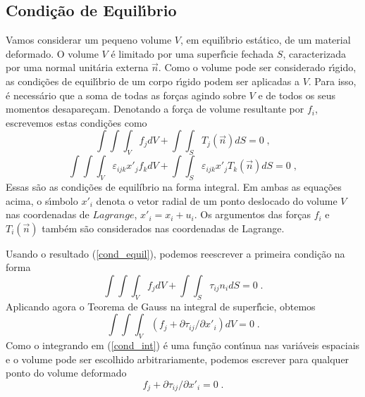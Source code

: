\subsection{Condi\c{c}\~ao de Equil\'{\i}brio}

Vamos considerar um pequeno volume $V$, em
equil\'{\i}brio est\'atico, de um material deformado.
O volume $V$ \'e limitado por uma
superf\'{\i}cie fechada $S$, caracterizada por uma normal unit\'aria
externa $\vec{n}$. Como o volume pode ser considerado r\'{\i}gido,
as condi\c{c}\~oes de equil\'{\i}brio de um corpo r\'{\i}gido
podem ser aplicadas a $V$. Para isso, \'e necess\'ario que a soma
de todas as for\c{c}as agindo sobre $V$ e de todos os seus momentos
desapare\c{c}am. Denotando a for\c{c}a de volume resultante por
$f_i$, escrevemos estas condi\c{c}\~oes como
\begin{equation}
\label{eq:equilib-for}
 \int \!\! \int \!\!  \int_V f_j dV + \int \!\! \int_S T_j
(\vec{n}) dS = 0 \;,
\end{equation}
\begin{equation}
\label{eq:equilib-momen}
 \int \!\! \int \!\!  \int_V \varepsilon_{ijk} x'_j f_k dV + \int \!\! \int_S
\varepsilon_{ijk} x'_j T_k (\vec{n}) dS = 0 \;,
\end{equation}
Essas s\~ao as condi\c{c}\~oes de equil\'ibrio na forma integral.
Em ambas as equa\c{c}\~oes acima, o
s\'{\i}mbolo $x'_i$ denota o vetor radial de um ponto deslocado do
volume $V$ nas coordenadas de $Lagrange$, $x'_i = x_i+u_i$. Os
argumentos das for\c{c}as $f_i$ e $T_i (\vec{n})$ tamb\'em s\~ao
considerados nas coordenadas de Lagrange.

Usando o resultado (\ref{cond_equil}), podemos reescrever a
primeira condi\c{c}\~ao na forma
\begin{equation} \int \!\! \int
\!\! \int_V f_j dV + \int \!\! \int_S \tau_{ij}n_i dS = 0 \;.
\end{equation}
Aplicando agora o Teorema de Gauss na integral de superf\'{\i}cie,
obtemos
\begin{equation}
\int \!\! \int \!\!  \int_V (f_j + \partial \tau_{ij}/\partial x'_i
)dV= 0 \;. \label{cond_int}
\end{equation}
Como o integrando em (\ref{cond_int}) \'e uma fun\c{c}\~ao
cont\'{\i}nua nas vari\'aveis espaciais e o volume pode ser
escolhido arbitrariamente, podemos escrever para qualquer ponto do
volume deformado
\begin{equation}
f_j + \partial \tau_{ij}/\partial x'_i = 0 \;.
\label{eq_equi_back}
\end{equation}

